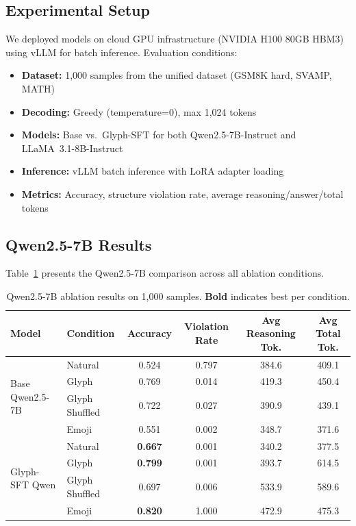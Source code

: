 \documentclass[11pt]{article}
\begin{document}
\subsection{Experimental Setup}

We deployed models on cloud GPU infrastructure (NVIDIA H100 80GB HBM3) using vLLM for batch inference. Evaluation conditions:

\begin{itemize}
    \item \textbf{Dataset:} 1{,}000 samples from the unified dataset (GSM8K hard, SVAMP, MATH)
    \item \textbf{Decoding:} Greedy (temperature=0), max 1{,}024 tokens
    \item \textbf{Models:} Base vs.\ Glyph-SFT for both Qwen2.5-7B-Instruct and LLaMA~3.1-8B-Instruct
    \item \textbf{Inference:} vLLM batch inference with LoRA adapter loading
    \item \textbf{Metrics:} Accuracy, structure violation rate, average reasoning/answer/total tokens
\end{itemize}

\subsection{Qwen2.5-7B Results}

Table~\ref{tab:qwen_results} presents the Qwen2.5-7B comparison across all ablation conditions.

\begin{table}[h]
\centering
\caption{Qwen2.5-7B ablation results on 1{,}000 samples. \textbf{Bold} indicates best per condition.}
\label{tab:qwen_results}
\begin{tabular}{@{}llcccc@{}}
\toprule
\textbf{Model} & \textbf{Condition} & \textbf{Accuracy} & \textbf{Violation Rate} & \textbf{Avg Reasoning Tok.} & \textbf{Avg Total Tok.} \\
\midrule
\multirow{4}{*}{Base Qwen2.5-7B}
    & Natural        & 0.524 & 0.797 & 384.6 & 409.1 \\
    & Glyph          & 0.769 & 0.014 & 419.3 & 450.4 \\
    & Glyph Shuffled & 0.722 & 0.027 & 390.9 & 439.1 \\
    & Emoji          & 0.551 & 0.002 & 348.7 & 371.6 \\
\midrule
\multirow{4}{*}{Glyph-SFT Qwen}
    & Natural        & \textbf{0.667} & 0.001 & 340.2 & 377.5 \\
    & Glyph          & \textbf{0.799} & 0.001 & 393.7 & 614.5 \\
    & Glyph Shuffled & 0.697 & 0.006 & 533.9 & 589.6 \\
    & Emoji          & \textbf{0.820} & 1.000 & 472.9 & 475.3 \\
\bottomrule
\end{tabular}
\end{table}
\end{document}
